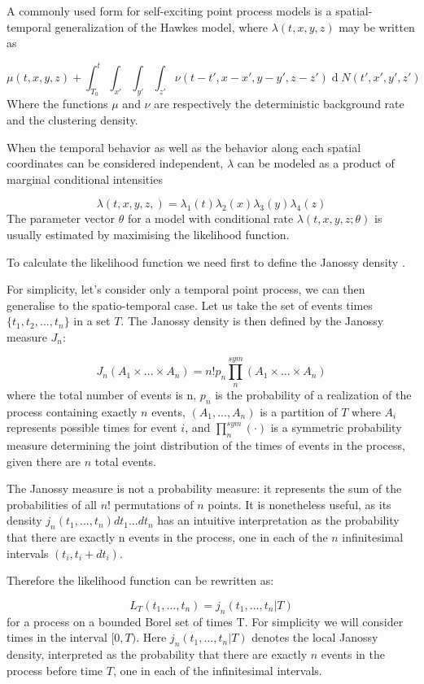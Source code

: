\documentclass[11pt,a4paper]{article}
\renewcommand{\d}[1]{\ensuremath{\operatorname{d}\!{#1}}}
\begin{document}
A commonly used form for self-exciting point process models is a spatial-temporal generalization of the Hawkes model, where $\lambda(t,x,y,z)$ may be written as

\[
\mu(t,x,y,z) + \int_{T_{0}}^{t} \int_{x'} \int_{y'} \int_{z'} \nu (t-t', x-x', y-y', z-z') \d N (t', x', y', z')
\]
Where the functions $\mu$ and $\nu$ are respectively the deterministic background rate and the clustering density.

When the temporal behavior as well as the behavior along each spatial coordinates can be considered independent, $\lambda$ can be modeled as a product of marginal conditional intensities 

\[
\lambda(t,x,y,z,) = \lambda_{1}(t) \lambda_{2}(x) \lambda_{3}(y) \lambda_{4}(z)
\]
The parameter vector $\theta$ for a model with conditional rate $\lambda (t, x, y, z; \theta)$ is usually estimated by maximising the likelihood function.

To calculate the likelihood function we need first to define the Janossy density \cite{Reinhart}. 

For simplicity, let's consider only a temporal point process, we can then generalise to the spatio-temporal case.
Let us take the set of events times $\{t_{1}, t_{2},  ... , t_{n} \}$ in a set $T$. The Janossy density is then defined by the Janossy measure $J_{n}$:

\[
J_{n}(A_{1} \times ... \times A_{n}) = n! p_{n} \prod_{n}^{sym} (A_{1} \times ... \times A_{n})
\]
where the total number of events is n, $p_{n}$ is the probability of a realization of the process containing exactly $n$ events, $(A_{1}, . . . , A_{n})$ is a partition of $T$ where $A_{i}$ represents possible times for event $i$, and $\prod_{n}^{sym}(\cdot)$ is a symmetric probability measure determining the joint distribution of the times of events in the process, given there are $n$ total events.

The Janossy measure is not a probability measure: it represents the sum of the probabilities of all $n!$ permutations of $n$ points. It is nonetheless useful, as its density $j_{n}(t_{1}, . . . , t_{n}) dt_{1} ... dt_{n}$ has an intuitive interpretation as the probability that there are exactly n events in the process, one in each of the $n$ infinitesimal intervals $(t_{i}, t_{i} + dt_{i})$.

Therefore the likelihood function can be rewritten as:

\[
L_{T}(t_{1}, ... , t_{n}) = j_{n}(t_{1}, ... ,t_{n} | T)
\]
for a process on a bounded Borel set of times T. For simplicity we will consider times in the interval $[0, T)$. Here $ j_{n}(t_{1}, ... ,t_{n} | T)$ denotes the local Janossy density, interpreted as the probability that there are exactly $n$ events in the process before time $T$, one in each of the infinitesimal intervals.
\end{document}
